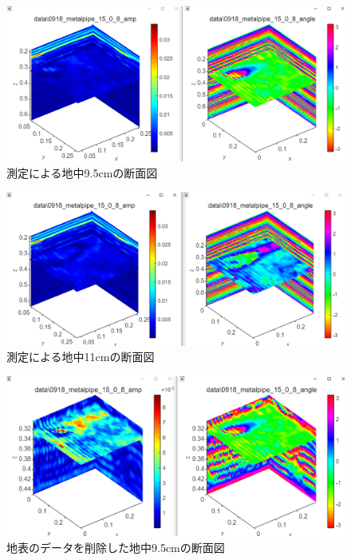 \documentclass[a4paper,12pt]{jsreport}
\begin{document}
\begin{figure}[h]
  \begin{center}
   \includegraphics[width=14cm]{dataimage/matlab/0918_metalpipe_(15,0,8)_xdirection_d=32cm.png}
  \caption{測定による地中9.5cmの断面図}\label{測定による地中9.5cmの断面図}
  \end{center}
  \end{figure}
  \begin{figure}[h]
    \begin{center}
     \includegraphics[width=14cm]{dataimage/matlab/0918_metalpipe_(15,0,8)_xdirection_d=34cm.png}
    \caption{測定による地中11cmの断面図}\label{測定による地中11cmの断面図}
    \end{center}
    \end{figure}
    \begin{figure}[h]
      \begin{center}
       \includegraphics[width=14cm]{dataimage/matlab/0918_metalpipe_(15,0,8)_xdirection_d=32cm_delete_unnecessary.png}
      \caption{地表のデータを削除した地中9.5cmの断面図}\label{地表のデータを削除した地中9.5cmの断面図}
      \end{center}
      \end{figure}
\end{document}
